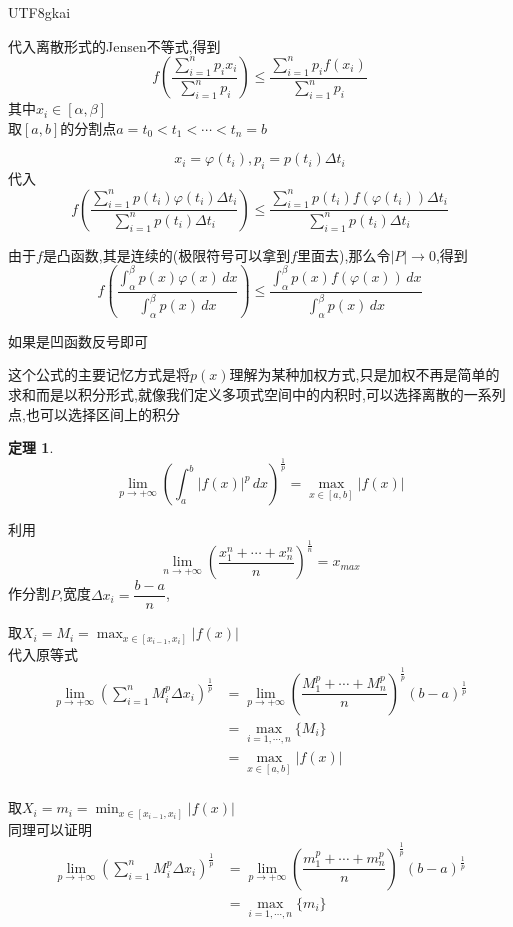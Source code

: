 \documentclass{article}
\newtheorem{theorem}{定理}[subsection]
\newenvironment{cproof}{%
\heiti{证明}\kaishu
}{%
}
\newcommand{\parameter}[1]{\left(#1\right)}
\newcommand{\abs}[1]{\left|#1\right|}
\begin{document}
\begin{CJK}{UTF8}{gkai}
\begin{cproof}
代入离散形式的Jensen不等式,得到
\[f\parameter{\dfrac{\sum_{i =1 }^{n} p_i x_i}{\sum_{i =1 }^{n} p_i}} \leq \dfrac{\sum_{i =1 }^{n} p_i f(x_i)}{\sum_{i =1 }^{n} p_i}\]
其中$x_i \in [\alpha,\beta]$\\

取$[a,b]$的分割点$a = t_0 < t_1 < \cdots < t_n = b$

\[x_i = \varphi(t_i), p_i = p(t_i) \Delta t_i\]
代入
\[f\parameter{\dfrac{\sum_{i =1 }^{n} p(t_i)  \varphi(t_i) \Delta t_i}{\sum_{i =1 }^{n} p(t_i) \Delta t_i}} \leq \dfrac{\sum_{i =1 }^{n} p(t_i)  f(\varphi(t_i)) \Delta t_i}{\sum_{i =1 }^{n} p(t_i) \Delta t_i}\]

由于$f$是凸函数,其是连续的(极限符号可以拿到$f$里面去),那么令$|P| \to 0$,得到
\[f\parameter{\dfrac{\int_{\alpha}^{\beta} p(x) \varphi(x)\,dx}{\int_{\alpha}^{\beta} p(x) \, dx}} \leq \dfrac{\int_{\alpha}^{\beta} p(x)f(\varphi(x)) \, dx }{\int_{\alpha}^{\beta}p(x) \,dx}\]

如果是凹函数反号即可
\end{cproof}

这个公式的主要记忆方式是将$p(x)$理解为某种加权方式,只是加权不再是简单的求和而是以积分形式,就像我们定义多项式空间中的内积时,可以选择离散的一系列点,也可以选择区间上的积分

\begin{theorem}
  \[\lim_{p \to + \infty} \parameter{\int_{a}^{b} |f(x)|^p \, dx}^{\frac{1}{p}} = \max_{x\in[a,b]}\abs{f(x)}\]
\end{theorem}

\begin{cproof}
利用
\[\lim_{n \to +\infty} \parameter{\dfrac{x_1^n + \cdots + x_n^n}{n}}^{\frac{1}{n}} = x_{max}\]
作分割$P$,宽度$\Delta x_i = \dfrac{b - a}{n}$,

取$X_i = M_i = \max_{x\in[x_{i - 1}, x_i]}\abs{f(x)}$\\
代入原等式
\[
\begin{aligned}
  \lim_{p \to +\infty} \parameter{\sum_{i = 1}^{n} M_i^p \Delta x_i}^{\frac{1}{p}} &= \lim_{p \to +\infty} \parameter{\dfrac{M_1^p +\cdots +M_n^p}{n}}^{\frac{1}{p}} (b - a)^{\frac{1}{p}}\\
  &= \max_{i = 1,\cdots ,n}\{M_i\}\\
  &= \max_{x\in[a,b]}\abs{f(x)}\\
\end{aligned}  
  \]

取$X_i = m_i = \min_{x\in[x_{i - 1}, x_i]}\abs{f(x)}$\\
同理可以证明
\[
\begin{aligned}
  \lim_{p \to +\infty} \parameter{\sum_{i = 1}^{n} M_i^p \Delta x_i}^{\frac{1}{p}} &= \lim_{p \to +\infty} \parameter{\dfrac{m_1^p +\cdots +m_n^p}{n}}^{\frac{1}{p}} (b - a)^{\frac{1}{p}}\\
  &= \max_{i = 1,\cdots ,n}\{m_i\}\\
\end{aligned}  
  \]


\end{cproof}
\end{CJK}
\end{document}

